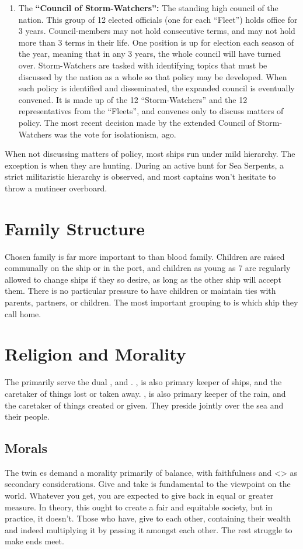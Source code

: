 \documentclass[blue]{GL2020}
\begin{document}
\begin{enumerate}
		\item The {\bf``Council of Storm-Watchers'':} The standing high council of the \pShip{} nation. This group of 12 elected officials (one for each ``Fleet'') holds office for 3 years. Council-members may not hold consecutive terms, and may not hold more than 3 terms in their life. One position is up for election each season of the year, meaning that in any 3 years, the whole council will have turned over. Storm-Watchers are tasked with identifying topics that must be discussed by the nation as a whole so that policy may be developed. When such policy is identified and disseminated, the expanded council is eventually convened. It is made up of the 12 ``Storm-Watchers'' and the 12 representatives from the ``Fleets'', and convenes only to discuss matters of policy. The most recent decision made by the extended Council of Storm-Watchers was the vote for isolationism, \pIsolation{} ago.
\end{enumerate}

When not discussing matters of policy, most ships run under mild hierarchy. The exception is when they are hunting. During an active hunt for Sea Serpents, a strict militaristic hierarchy is observed, and most captains won't hesitate to throw a mutineer overboard.

\section*{Family Structure}
Chosen family is far more important to \pShippies{} than blood family. Children are raised communally on the ship or in the port, and children as young as 7 are regularly allowed to change ships if they so desire, as long as the other ship will accept them. There is no particular pressure to have children or maintain ties with parents, partners, or children. The most important grouping to \pShippies{} is which ship they call home.

\section*{Religion and Morality}
The \pShippies{} primarily serve the dual \cEbb{\God}, \cEbb{} and \cFlow{}. \cEbbFull{\MYname}, is also primary keeper of ships, and the caretaker of things lost or taken away. \cFlowFull{\MYname}, is also primary keeper of the rain, and the caretaker of things created or given. They preside jointly over the sea and their people.


\subsection*{Morals}
The twin \cEbb{\God}es demand a morality primarily of balance, with faithfulness and <> as secondary considerations. Give and take is fundamental to the \pShip{} viewpoint on the world. Whatever you get, you are expected to give back in equal or greater measure. In theory, this ought to create a fair and equitable society, but in practice, it doesn't. Those who have, give to each other, containing their wealth and indeed multiplying it by passing it amongst each other. The rest struggle to make ends meet. 
\end{document}
